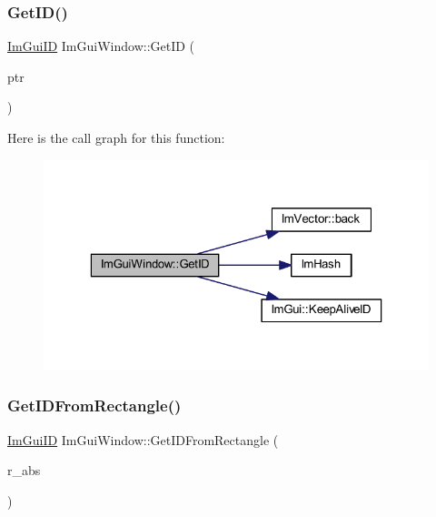 \subsubsection{\texorpdfstring{Get\+I\+D()}{GetID()}\hspace{0.1cm}{\footnotesize\ttfamily [2/2]}}
{\footnotesize\ttfamily \mbox{\hyperlink{imgui_8h_a1785c9b6f4e16406764a85f32582236f}{Im\+Gui\+ID}} Im\+Gui\+Window\+::\+Get\+ID (\begin{DoxyParamCaption}\item[{const void $\ast$}]{ptr }\end{DoxyParamCaption})}

Here is the call graph for this function\+:
\nopagebreak
\begin{figure}[H]
\begin{center}
\leavevmode
\includegraphics[width=323pt]{struct_im_gui_window_aae21dffb343cabca9414499b827912a8_cgraph}
\end{center}
\end{figure}
\mbox{\label{struct_im_gui_window_a44931b6e73248930490d2c89377a8233}} 
\subsubsection{\texorpdfstring{Get\+I\+D\+From\+Rectangle()}{GetIDFromRectangle()}}
{\footnotesize\ttfamily \mbox{\hyperlink{imgui_8h_a1785c9b6f4e16406764a85f32582236f}{Im\+Gui\+ID}} Im\+Gui\+Window\+::\+Get\+I\+D\+From\+Rectangle (\begin{DoxyParamCaption}\item[{const \mbox{\hyperlink{struct_im_rect}{Im\+Rect}} \&}]{r\+\_\+abs }\end{DoxyParamCaption})}

